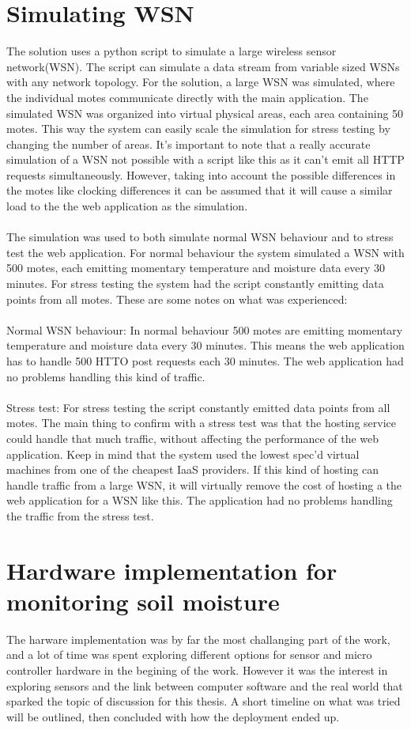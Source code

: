\documentclass[]{uiophd}
\begin{document}
\section{Simulating WSN}
The solution uses a python script to simulate a large wireless sensor network(WSN). The script can simulate a data stream from variable sized WSNs with any network topology. For the solution, a large WSN was simulated, where the individual motes communicate directly with the main application. The simulated WSN was organized into virtual physical areas, each area containing 50 motes. This way the system can easily scale the simulation for stress testing by changing the number of areas. It’s important to note that a really accurate simulation of a WSN not possible with a script like this as it can’t emit all HTTP requests simultaneously. However, taking into account the possible differences in the motes like clocking differences it can be assumed that it will cause a similar load to the the web application as the simulation.
\\\\
The simulation was used to both simulate normal WSN behaviour and to stress test the web application. For normal behaviour the system simulated a WSN with 500 motes, each emitting momentary temperature and moisture data every 30 minutes. For stress testing the system had the script constantly emitting data points from all motes. These are some notes on what was experienced:
\\\\
Normal WSN behaviour: In normal behaviour 500 motes are emitting momentary temperature and moisture data every 30 minutes. This means the web application has to handle 500 HTTO post requests each 30 minutes. The web application had no problems handling this kind of traffic.
\\\\
Stress test:  For stress testing the script constantly emitted data points from all motes. The main thing to confirm with a stress test was that the hosting service could handle that much traffic, without affecting the performance of the web application. Keep in mind that the system used the lowest spec’d virtual machines from one of the cheapest IaaS providers. If this kind of hosting can handle traffic from a large WSN, it will virtually remove the cost of hosting a the web application for a WSN like this. The application had no problems handling the traffic from the stress test.

  
\section{Hardware implementation for monitoring soil moisture}
The harware implementation was by far the most challanging part of the work, and a lot of time was spent exploring different options for sensor and micro controller hardware in the begining of the work. However it was the interest in exploring sensors and the link between computer software and the real world that sparked the topic of discussion for this thesis. A short timeline on what was tried will be outlined, then concluded with how the deployment ended up.
\end{document}
